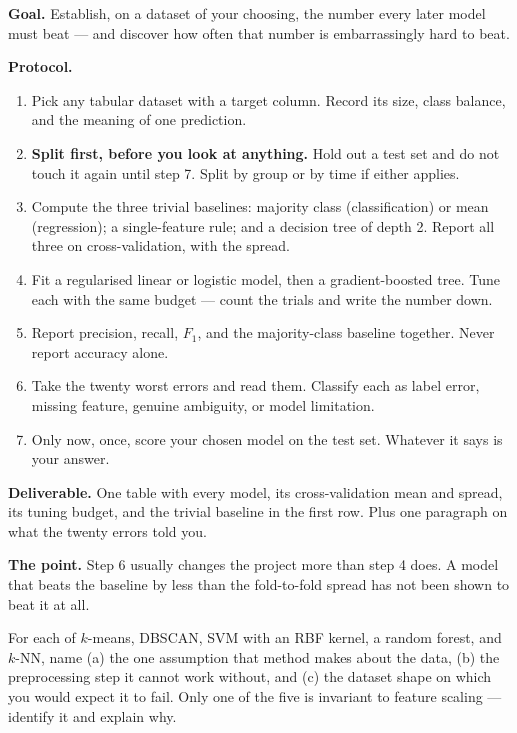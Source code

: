 \begin{practicallab}
\textbf{Goal.} Establish, on a dataset of your choosing, the number every later
model must beat --- and discover how often that number is embarrassingly hard
to beat.

\textbf{Protocol.}
\begin{enumerate}
  \item Pick any tabular dataset with a target column. Record its size, class
        balance, and the meaning of one prediction.
  \item \textbf{Split first, before you look at anything.} Hold out a test set
        and do not touch it again until step 7. Split by group or by time if
        either applies.
  \item Compute the three trivial baselines: majority class (classification) or
        mean (regression); a single-feature rule; and a decision tree of
        depth 2. Report all three on cross-validation, with the spread.
  \item Fit a regularised linear or logistic model, then a gradient-boosted
        tree. Tune each with the same budget --- count the trials and write the
        number down.
  \item Report precision, recall, $F_1$, and the majority-class baseline
        together. Never report accuracy alone.
  \item Take the twenty worst errors and read them. Classify each as label
        error, missing feature, genuine ambiguity, or model limitation.
  \item Only now, once, score your chosen model on the test set. Whatever it
        says is your answer.
\end{enumerate}

\textbf{Deliverable.} One table with every model, its cross-validation mean and
spread, its tuning budget, and the trivial baseline in the first row. Plus one
paragraph on what the twenty errors told you.

\textbf{The point.} Step 6 usually changes the project more than step 4 does.
A model that beats the baseline by less than the fold-to-fold spread has not
been shown to beat it at all.
\end{practicallab}

\begin{checkpoint}
For each of $k$-means, DBSCAN, SVM with an RBF kernel, a random forest, and
$k$-NN, name (a) the one assumption that method makes about the data, (b) the
preprocessing step it cannot work without, and (c) the dataset shape on which
you would expect it to fail. Only one of the five is invariant to feature
scaling --- identify it and explain why.
\end{checkpoint}

